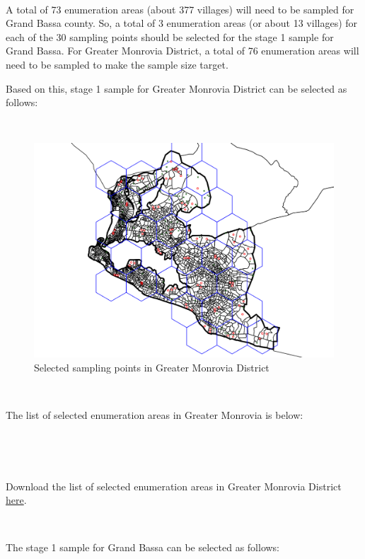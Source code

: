 \documentclass[12pt,a4paper]{book}
\theoremstyle{definition}
\theoremstyle{definition}
\theoremstyle{definition}
\theoremstyle{remark}
\let\BeginKnitrBlock\begin \let\EndKnitrBlock\end
\begin{document}
~

A total of 73 enumeration areas (about 377 villages) will need to be
sampled for Grand Bassa county. So, a total of 3 enumeration areas (or
about 13 villages) for each of the 30 sampling points should be selected
for the stage 1 sample for Grand Bassa. For Greater Monrovia District, a
total of 76 enumeration areas will need to be sampled to make the sample
size target.

Based on this, stage 1 sample for Greater Monrovia District can be
selected as follows:

~

\begin{figure}[H]

\includegraphics{figures/sample24-1} \hfill{}

\caption{Selected sampling points in Greater Monrovia District}\label{fig:sample24}
\end{figure}

~

The list of selected enumeration areas in Greater Monrovia is below:

~

~

\BeginKnitrBlock{rmddownload}
Download the list of selected enumeration areas in Greater Monrovia
District \href{data/greaterMonroviaSPlist.csv}{here}.
\EndKnitrBlock{rmddownload}

~

The stage 1 sample for Grand Bassa can be selected as follows:

~
\end{document}
